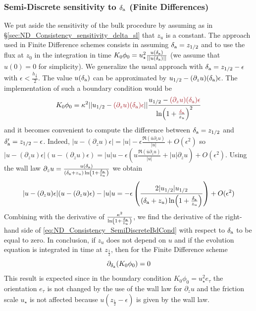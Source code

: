 \subsubsection{Semi-Discrete sensitivity to $\delta_{\rm a}$
			(Finite Differences)}
\label{sec:ND_Consistency_S-DAnalyticalStudy}
We put aside the sensitivity of the bulk procedure by
assuming as in \S \ref{sec:ND_Consistency_sensitivity_delta_sl}
that $z_{u}$ is a constant.
%
The approach used in Finite Difference schemes consists in assuming
$\delta_{\rm a} = z_{1/2}$ and to use the flux at $z_0$ in
the integration in time
$K_0\phi_0 = u_\star^2
\frac{u(\delta_{\rm a})}{||u(\delta_{\rm a})||}$
(we assume that $u(0)=0$ for simplicity).
We generalize the usual approach with
$\delta_{\rm a} = z_{1/2} - \epsilon$ with
$\epsilon < \frac{h_{\frac{1}{2}}}{2}$. 
The value $u(\delta_{\rm a})$ can be approximated
by $u_{1/2} - (\partial_z u)(\delta_{\rm a})\epsilon$.
The implementation of such a boundary condition would be
\begin{equation}
	\label{eq:ND_Consistency_SemiDiscreteBdCond}
K_0\phi_0 = 
	\kappa^2 ||u_{1/2} -
	\emphase{(\partial_z u)(\delta_{\rm a})\epsilon} ||
	\frac{u_{1/2} -
	\emphase{(\partial_z u)(\delta_{\rm a})\epsilon 
	}}{\ln(1+\frac{\emphase{\delta_{\rm a}}}{z_{u}})^2}
\end{equation}
and it becomes convenient to compute the difference between
$\delta_{\rm a}=z_{1/2}$ and $\delta_{\rm a}'=z_{1/2}-\epsilon$.
Indeed,
$|u - (\partial_z u) \epsilon| = |u| -
\epsilon \frac{\mathfrak{R}(\overline{u} \partial_z u)}{|u|}
+ O(\epsilon^2)$ so
$|u - (\partial_z u) \epsilon|(u - (\partial_z u) \epsilon) =
|u|u -
\epsilon \left(
u\frac{\mathfrak{R}(\overline{u} \partial_z u)}{|u|}
+ |u| \partial_z u
\right)
+ O(\epsilon^2)$.
Using the wall law
$\partial_z u=\frac{u(\delta_{\rm a})}{(\delta_{\rm a} + z_u)
\ln(1+\frac{\delta_{\rm a}}{z_u})}$ we obtain 
\begin{equation}
|u - (\partial_z u) \epsilon|(u - (\partial_z u) \epsilon) - |u|u =
	- \epsilon \left(\frac{2|u_{1/2}|u_{1/2}}
	{(\delta_{\rm a} + z_u) \ln(1+\frac{\delta_{\rm a}}{z_u})}
	\right)+ O(\epsilon^2)
\end{equation}
Combining with the derivative of
$\frac{\kappa^2}{\ln(1+\frac{\delta_{\rm a}}{z_u})}$,
we find the derivative of the right-hand side of
\eqref{eq:ND_Consistency_SemiDiscreteBdCond} with respect to
$\delta_{\rm a}$ to be equal to zero.
In conclusion, if $z_{u}$ does not depend on $u$ and if
the evolution equation is integrated in time at $z_\frac{1}{2}$,
then for the Finite Difference scheme
\begin{equation}
	\partial_{\delta_{\rm a}} (K_0 \phi_0) = 0
\end{equation}
This result is expected since in the boundary condition
$K_0 \phi_0 = u_\star^2 e_\tau$ the orientation $e_\tau$ is
not changed by the use of the wall law for $\partial_z u$
and the friction scale $u_\star$ is not affected because
$u(z_\frac{1}{2} - \epsilon)$ is given by the wall law.
